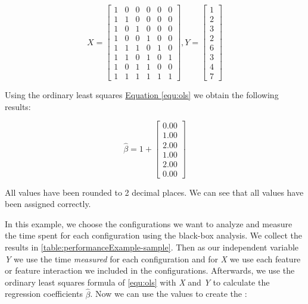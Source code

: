 \begin{equation}\label{equ:exampleIndependentDependent}
    \textit{X} = 
    \begin{bmatrix} 
        1 & 0 & 0 & 0 & 0 & 0 \\
        1 & 1 & 0 & 0 & 0 & 0 \\
        1 & 0 & 1 & 0 & 0 & 0 \\
        1 & 0 & 0 & 1 & 0 & 0 \\
        1 & 1 & 1 & 0 & 1 & 0 \\
        1 & 1 & 0 & 1 & 0 & 1 \\
        1 & 0 & 1 & 1 & 0 & 0 \\
        1 & 1 & 1 & 1 & 1 & 1 
      \end{bmatrix}
      ,
      \textit{Y} =
      \begin{bmatrix}
        1 \\
        2 \\
        3 \\
        2 \\
        6 \\
        3 \\
        4 \\
        7 
      \end{bmatrix}
\end{equation}


Using the ordinary least squares \hyperref[equ:ols]{Equation \ref*{equ:ols}}  we obtain the following results:

\begin{equation}
    \hat{\beta} = 1 + 
    \begin{bmatrix}
        0.00 \\
        1.00 \\
        2.00 \\
        1.00 \\
        2.00 \\
        0.00
    \end{bmatrix}
\end{equation}

All values have been rounded to 2 decimal places. We can see that all values have been assigned correctly.

In this example, we choose the configurations we want to analyze and measure the time spent for each configuration using the black-box analysis. 
We collect the results in \autoref{table:performanceExample-sample}. 
Then as our independent variable \textit{Y} we use the time \textit{measured} for each configuration 
and for \textit{X} we use each feature or feature interaction we included in the configurations. 
Afterwards, we use the ordinary least squares formula of \autoref{equ:ols} with \textit{X} and \textit{Y} to calculate the regression coefficients $\hat{\beta}$. 
Now we can use the values to create the \perfInfluenceModel:


